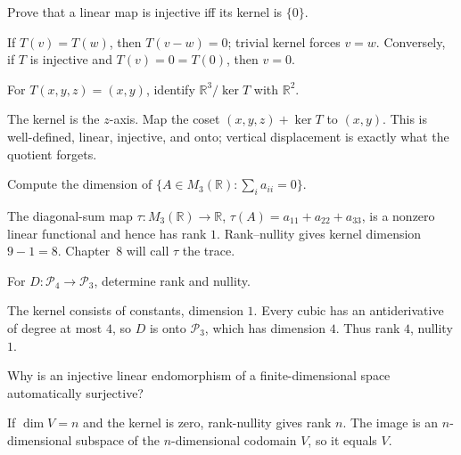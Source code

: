 \begin{problem}\label{prob:i06-problem-02}
Prove that a linear map is injective iff its kernel is $\{0\}$.
\end{problem}
\begin{solution}
If $T(v)=T(w)$, then $T(v-w)=0$; trivial kernel forces $v=w$. Conversely, if $T$ is injective and $T(v)=0=T(0)$, then $v=0$.
\end{solution}

\begin{problem}\label{prob:i06-problem-03}
For $T(x,y,z)=(x,y)$, identify $\mathbb R^3/\ker T$ with $\mathbb R^2$.
\end{problem}
\begin{solution}
The kernel is the $z$-axis. Map the coset $(x,y,z)+\ker T$ to $(x,y)$. This is well-defined, linear, injective, and onto; vertical displacement is exactly what the quotient forgets.
\end{solution}

\begin{problem}\label{prob:i06-problem-04}
Compute the dimension of $\{A\in M_3(\mathbb R):\sum_i a_{ii}=0\}$.
\end{problem}
\begin{solution}
The diagonal-sum map $\tau:M_3(\mathbb R)\to\mathbb R$, $\tau(A)=a_{11}+a_{22}+a_{33}$, is a nonzero linear functional and hence has rank $1$. Rank--nullity gives kernel dimension $9-1=8$. Chapter~8 will call $\tau$ the trace.
\end{solution}

\begin{problem}\label{prob:i06-problem-05}
For $D:\mathcal P_4\to\mathcal P_3$, determine rank and nullity.
\end{problem}
\begin{solution}
The kernel consists of constants, dimension $1$. Every cubic has an antiderivative of degree at most $4$, so $D$ is onto $\mathcal P_3$, which has dimension $4$. Thus rank $4$, nullity $1$.
\end{solution}

\begin{problem}\label{prob:i06-problem-06}
Why is an injective linear endomorphism of a finite-dimensional space automatically surjective?
\end{problem}
\begin{solution}
If $\dim V=n$ and the kernel is zero, rank-nullity gives rank $n$. The image is an $n$-dimensional subspace of the $n$-dimensional codomain $V$, so it equals $V$.
\end{solution}

